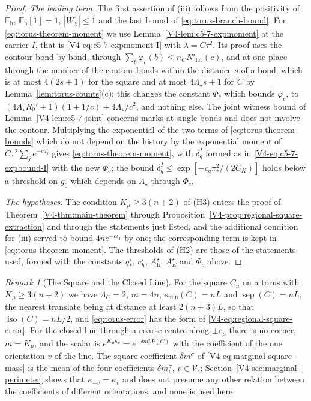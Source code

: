 \documentclass[11pt]{article}
\newcommand{\iso}{\operatorname{iso}}
\newcommand{\sep}{\operatorname{sep}}
\numberwithin{equation}{section}
\theoremstyle{remark}
\newtheorem{remark}[theorem]{Remark}
\theoremstyle{plain}
\begin{document}
\begin{proof}
\emph{The leading term.} The first assertion of (iii) follows from the positivity of $\mathbb E_{\mathrm h}$, $\mathbb E_{\mathrm h}[1]=1$, $| W_{\chi}|\leqslant 1$ and the last bound of \eqref{eq:torus-branch-bound}. For \eqref{eq:torus-theorem-moment} we use Lemma~\ref{V4-lem:c5-7-expmoment} at the carrier $I$, that is \eqref{V4-eq:c5-7-expmoment-I} with $\lambda= C\tau^2$. Its proof uses the contour bond by bond, through $\sum_b\varphi_c(b)\leqslant n_CN'_{\mathrm{lat}}(c)$, and at one place through the number of the contour bonds within the distance $s$ of a bond, which is at most $4(2s+1)$ for the square and at most $4\Lambda_{\star}s+1$ for $C$ by Lemma~\ref{lem:torus-counts}(c); this changes the constant $\Phi_c$ which bounds $\varphi_c$, to $(4\Lambda_{\star}R_0'+1)(1+1/c)+4\Lambda_{\star}/c^2$, and nothing else. The joint witness bound of Lemma~\ref{V4-lem:c5-7-joint} concerns marks at single bonds and does not involve the contour. Multiplying the exponential of the two terms of \eqref{eq:torus-theorem-bounds} which do not depend on the history by the exponential moment of $C\tau^2\sum_je^{-cd_j}$ gives \eqref{eq:torus-theorem-moment}, with $\delta^I_q$ formed as in \eqref{V4-eq:c5-7-expbound-I} with the new $\Phi_c$; the bound $\delta^I_q\leqslant \exp[-c_q\pi_*^2/(2C_K)]$ holds below a threshold on $g_0$ which depends on $\Lambda_{\star}$ through $\Phi_c$.

\emph{The hypotheses.} The condition $K_{\mu}\geqslant 3(n+2)$ of (H3) enters the proof of Theorem~\ref{V4-thm:main-theorem} through Proposition~\ref{V4-prop:regional-square-extraction} and through the statements just listed, and the additional condition for (iii) served to bound $4ne^{-c\iota_T}$ by one; the corresponding term is kept in \eqref{eq:torus-theorem-moment}. The thresholds of (H2) are those of the statements used, formed with the constants $q_*^{\star}$, $c_h^{\star}$, $A_{\mathrm h}^{\star}$, $A_E^{\star}$ and $\Phi_c$ above.
\end{proof}

\begin{remark}[The Square and the Closed Line]\label{rem:torus-special-cases}
For the square $C_n$ on a torus with $K_{\mu}\geqslant 3(n+2)$ we have $\Lambda_C=2$, $m=4n$, $s_{\min}(C)= nL$ and $\sep(C)= nL$, the nearest translate being at distance at least $2(n+3)L$, so that $\iso(C)= nL/2$, and \eqref{eq:torus-error} has the form of \eqref{V4-eq:regional-square-error}. For the closed line through a coarse centre along $\pm e_{\mu}$ there is no corner, $m= K_{\mu}$, and the scalar is $e^{K_{\mu}\kappa_v}= e^{-\delta m^{\sigma}_vP(C)}$ with the coefficient of the one orientation $v$ of the line. The square coefficient $\delta m^{\sigma}$ of \eqref{V4-eq:marginal-square-mass} is the mean of the four coefficients $\delta m^{\sigma}_v$, $v\in\mathscr V_{\square}$; Section~\ref{V4-sec:marginal-perimeter} shows that $\kappa_{-v}=\overline{\kappa_v}$ and does not presume any other relation between the coefficients of different orientations, and none is used here.
\end{remark}
\end{document}
